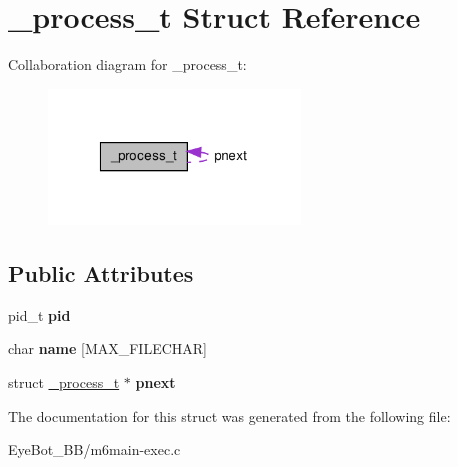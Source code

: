 \hypertarget{struct__process__t}{\section{\-\_\-process\-\_\-t \-Struct \-Reference}
\label{struct__process__t}
}


\-Collaboration diagram for \-\_\-process\-\_\-t\-:\nopagebreak
\begin{figure}[H]
\begin{center}
\leavevmode
\includegraphics[width=190pt]{struct__process__t__coll__graph}
\end{center}
\end{figure}
\subsection*{\-Public \-Attributes}
\begin{DoxyCompactItemize}
\item 
\hypertarget{struct__process__t_a54a107612ada76c32f89a3a79b3d5d09}{pid\-\_\-t {\bfseries pid}}\label{struct__process__t_a54a107612ada76c32f89a3a79b3d5d09}

\item 
\hypertarget{struct__process__t_ae7a380e183d1a220458926d91785b2b5}{char {\bfseries name} \mbox{[}\-M\-A\-X\-\_\-\-F\-I\-L\-E\-C\-H\-A\-R\mbox{]}}\label{struct__process__t_ae7a380e183d1a220458926d91785b2b5}

\item 
\hypertarget{struct__process__t_a402f1eef604ccf8f67192773c9ffdab3}{struct \hyperlink{struct__process__t}{\-\_\-process\-\_\-t} $\ast$ {\bfseries pnext}}\label{struct__process__t_a402f1eef604ccf8f67192773c9ffdab3}

\end{DoxyCompactItemize}


\-The documentation for this struct was generated from the following file\-:\begin{DoxyCompactItemize}
\item 
\-Eye\-Bot\-\_\-\-B\-B/m6main-\/exec.\-c\end{DoxyCompactItemize}
